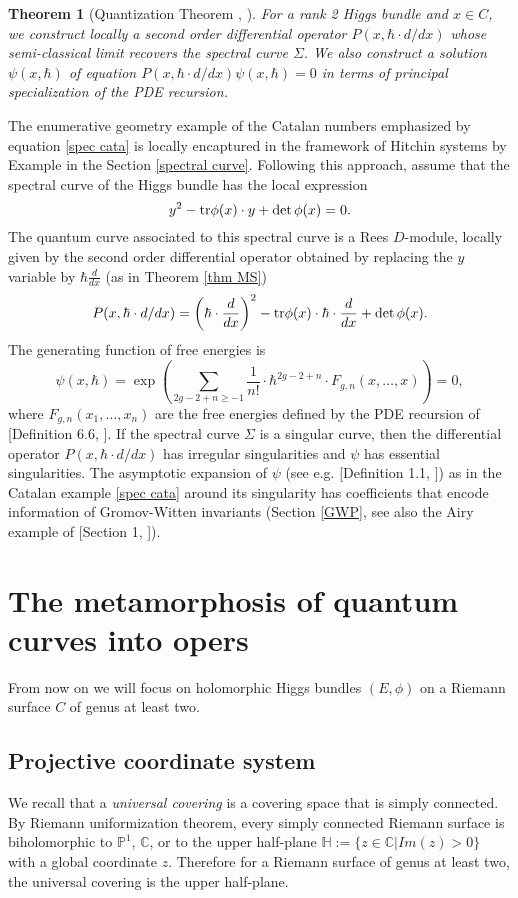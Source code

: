 \documentclass[oneside, 11pt]{amsart}
\newtheorem{thm}{Theorem}[section]
\theoremstyle{definition}
\numberwithin{equation}{subsection}
\def\tr{{\text{\rm{tr}}}}
\newcommand{\bP}{{\mathbb{P}}}
\begin{document}
\begin{thm}[Quantization Theorem \cite{OD8}, \cite{OD12}]\label{quantum}
For a rank 2 Higgs bundle and $x\in C$, we construct locally a second order differential operator $P(x,\hbar \cdot d/dx)$ whose semi-classical limit recovers the spectral curve $\Sigma$. We also construct a solution $\psi(x, \hbar)$ of equation $P(x,\hbar \cdot d/dx)\psi(x,\hbar)=0$ in terms of principal specialization of the PDE recursion.
\end{thm}


 
The enumerative geometry example of the Catalan numbers emphasized by equation \eqref{spec cata} is locally encaptured in the framework of Hitchin systems by Example in the Section \ref{spectral curve}. Following this approach, assume that the spectral curve of the Higgs bundle has the local expression
$$y^2-\tr \phi(x)\cdot y+\det \phi(x)=0.$$
The quantum curve associated to this spectral curve is a Rees $D$-module, locally given by the second order differential operator obtained by replacing the $y$ variable by $\hbar \frac{d}{dx}$ (as in Theorem \ref{thm MS})
$$P(x,\hbar \cdot d/dx)=\left(\hbar\cdot \frac{d}{dx}\right)^2-\tr \phi(x) \cdot \hbar \cdot\frac{d}{dx}+\det \phi(x).$$
The generating function of free energies is
$$\psi(x, \hbar)=\exp\left(\sum_{2g-2+n\ge -1}\frac{1}{n!}\cdot \hbar^{2g-2+n} \cdot F_{g,n}(x,\dots,x)
\right)=0,$$
where $F_{g,n}(x_1, \ldots, x_n)$ are the free energies defined by the PDE recursion 
of [Definition 6.6, \cite{OD12}]. If the spectral curve $\Sigma$ is a singular curve, then the differential operator $P(x,\hbar \cdot d/dx)$ has irregular singularities and $\psi$ has essential singularities. The asymptotic expansion  of $\psi$ (see e.g. [Definition 1.1, \cite{OD17}]) as in the Catalan example \eqref{spec cata} around its singularity has coefficients that encode information of Gromov-Witten invariants (Section \ref{GWP}, see also the Airy example of [Section 1, \cite{OD17}]). 
\newpage

\section{The metamorphosis of quantum curves into opers}\label{section 5}
\label{NAH}

From now on we will focus on holomorphic Higgs bundles $(E, \phi)$ on  a Riemann surface $C$ of genus at least two. 

\subsection{Projective coordinate system} 
We recall that a \textit{universal covering} is a covering space that is simply connected.
By Riemann uniformization theorem, every simply connected Riemann surface is biholomorphic to $\bP^1$, $\mathbb{C}$, or to the upper half-plane $\mathbb{H}:=\{z\in \mathbb{C}| Im (z)>0\}$  with a global coordinate $z$. Therefore for a Riemann surface of genus at least two, the universal covering is the upper half-plane.
\end{document}
